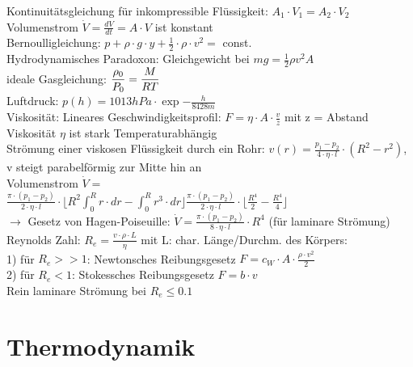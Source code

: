 \documentclass[fs, footer]{latex4ei}
\begin{document}
\begin{multicols*}{4}
Kontinuitätsgleichung für inkompressible Flüssigkeit: $A_1\cdot V_1 = A_2\cdot V_2$\\
Volumenstrom $\dot V = \frac{dV}{dt} = A\cdot V$ ist konstant\\
Bernoulligleichung: $p + \rho\cdot g\cdot y + \frac{1}{2}\cdot \rho\cdot v^2 =$ const.\\
Hydrodynamisches Paradoxon: Gleichgewicht bei $mg = \iffalse $p_{\text{atm}}\cdot A - p_1\cdot A =$ \fi
\frac{1}{2} \rho  v^2  A$\\ 
ideale Gasgleichung: $ \dfrac{\rho _0}{P_0} = \dfrac{M}{RT}$\\
Luftdruck: $p(h) = 1013hPa\cdot\exp{-\frac{h}{8428m}}$\\

Viskosität: Lineares Geschwindigkeitsprofil: $F = \eta\cdot A\cdot\frac{v}{z}$ mit z = Abstand\\
Viskosität $\eta$ ist stark Temperaturabhängig\\

Strömung einer viskosen Flüssigkeit durch ein Rohr: $v(r) = \frac{p_1-p_2}{4\cdot\eta\cdot l}\cdot(R^2-r^2)$, v steigt parabelförmig zur Mitte hin an\\
Volumenstrom $ \dot V =$\\ $\frac{\pi\cdot (p_1-p_2)}{2\cdot\eta\cdot l}\cdot\lfloor R^2\int_0^R r\cdot dr - \int_0^Rr^3\cdot dr\rfloor \frac{\pi\cdot(p_1-p_2)}{2\cdot\eta\cdot l}\cdot \lfloor \frac{R^4}{2}-\frac{R^4}{4}\rfloor $\\
$\rightarrow$ Gesetz von Hagen-Poiseuille: $\dot V  = \frac{\pi\cdot(p_1-p_2)}{8\cdot\eta\cdot l}\cdot R^4$ (für laminare Strömung)\\

Reynolds Zahl: $R_e = \frac{v \cdot\rho \cdot L}{\eta}$ mit L: char. Länge/Durchm. des Körpers:\\ 
1) für $R_e >> 1$: Newtonsches Reibungsgesetz $F = c_W \cdot A \cdot \frac{\rho\cdot v^2}{2}$\\
2) für $R_e < 1$: Stokessches Reibungsgesetz $F = b\cdot v$\\
Rein laminare Strömung bei $R_e \leq 0.1$\\





\section{Thermodynamik}


\end{multicols*}
\end{document}
